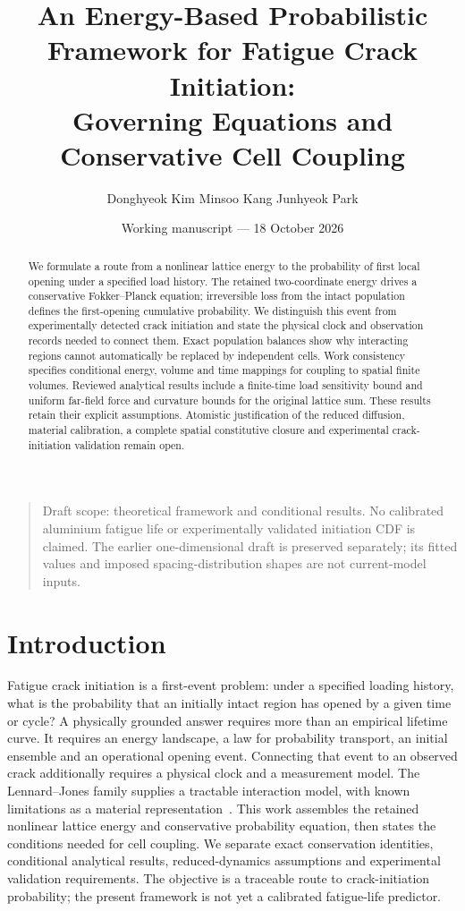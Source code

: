 \documentclass[11pt]{article}
\title{An Energy-Based Probabilistic Framework for Fatigue Crack Initiation:\\
Governing Equations and Conservative Cell Coupling}
\author{Donghyeok Kim \quad Minsoo Kang \quad Junhyeok Park}
\date{Working manuscript --- 18 October 2026}
\begin{document}
\maketitle
\begin{abstract}
We formulate a route from a nonlinear lattice energy to the probability of
first local opening under a specified load history. The retained two-coordinate
energy drives a conservative Fokker--Planck equation; irreversible loss from
the intact population defines the first-opening cumulative probability.
We distinguish this event from experimentally detected crack initiation and
state the physical clock and observation records needed to connect them.
Exact population balances show why interacting regions cannot automatically
be replaced by independent cells. Work consistency specifies conditional
energy, volume and time mappings for coupling to spatial finite volumes.
Reviewed analytical results include a finite-time load sensitivity bound
and uniform far-field force and curvature bounds for the original lattice sum.
These results retain their explicit assumptions. Atomistic justification of
the reduced diffusion, material calibration, a complete spatial constitutive
closure and experimental crack-initiation validation remain open.
\end{abstract}
\begin{quote}\small
Draft scope: theoretical framework and conditional results. No calibrated
aluminium fatigue life or experimentally validated initiation CDF is claimed.
The earlier one-dimensional draft is preserved separately; its fitted values
and imposed spacing-distribution shapes are not current-model inputs.
\end{quote}

\section{Introduction}
Fatigue crack initiation is a first-event problem: under a specified loading
history, what is the probability that an initially intact region has opened
by a given time or cycle? A physically grounded answer requires more than
an empirical lifetime curve. It requires an energy landscape, a law for
probability transport, an initial ensemble and an operational opening event.
Connecting that event to an observed crack additionally requires a physical
clock and a measurement model.
The Lennard--Jones family supplies a tractable interaction model, with known
limitations as a material representation~\cite{SchwerdtfegerWales2024}.
This work assembles the retained nonlinear lattice energy and conservative
probability equation, then states the conditions needed for cell coupling.
We separate exact conservation identities, conditional analytical results,
reduced-dynamics assumptions and experimental validation requirements.
The objective is a traceable route to crack-initiation probability;
the present framework is not yet a calibrated fatigue-life predictor.
\end{document}
